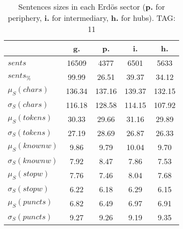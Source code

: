 \begin{table}[h!]
\begin{center}
\begin{tabular}{| l | c | c | c | c |}\hline
 & g. & p. & i. & h. \\\hline
$sents$ & 16509  & 4377  & 6501  & 5633 \\\hline
$sents_{\%}$ & 99.99  & 26.51  & 39.37  & 34.12 \\\hline
$\mu_S(chars)$ & 136.34  & 137.16  & 139.37  & 132.15 \\\hline
$\sigma_S(chars)$ & 116.18  & 128.58  & 114.15  & 107.92 \\\hline
$\mu_S(tokens)$ & 30.33  & 29.66  & 31.16  & 29.89 \\\hline
$\sigma_S(tokens)$ & 27.19  & 28.69  & 26.87  & 26.33 \\\hline
$\mu_S(knownw)$ & 9.86  & 9.79  & 10.04  & 9.70 \\\hline
$\sigma_S(knownw)$ & 7.92  & 8.47  & 7.86  & 7.53 \\\hline
$\mu_S(stopw)$ & 7.76  & 7.46  & 8.04  & 7.68 \\\hline
$\sigma_S(stopw)$ & 6.22  & 6.18  & 6.29  & 6.15 \\\hline
$\mu_S(puncts)$ & 6.82  & 6.49  & 6.97  & 6.91 \\\hline
$\sigma_S(puncts)$ & 9.27  & 9.26  & 9.19  & 9.35 \\\hline
\end{tabular}
\caption{Sentences sizes in each Erd\"os sector ({{\bf p.}} for periphery, {{\bf i.}} for intermediary, {{\bf h.}} for hubs). TAG: 11}
\end{center}
\end{table}